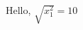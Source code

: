 \documentclass{article}
\begin{document}
\setlength{\parindent}{0pt}
Hello,
$\sqrt{x^2_1}=10$
\end{document}

